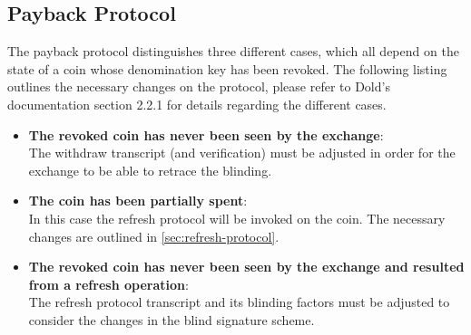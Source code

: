 \subsection{Payback Protocol}
The payback protocol distinguishes three different cases, which all depend on the state of a coin whose denomination key has been revoked.
The following listing outlines the necessary changes on the protocol, please refer to Dold's documentation section 2.2.1 \cite{dold:the-gnu-taler-system} for details regarding the different cases.
\begin{itemize}
  \item \textbf{The revoked coin has never been seen by the exchange}:
        \\The withdraw transcript (and verification) must be adjusted in order for the exchange to be able to retrace the blinding.
  \item \textbf{The coin has been partially spent}:
        \\In this case the refresh protocol will be invoked on the coin.
        The necessary changes are outlined in \ref{sec:refresh-protocol}.
  \item \textbf{The revoked coin has never been seen by the exchange and resulted from a refresh operation}:
        \\The refresh protocol transcript and its blinding factors must be adjusted to consider the changes in the blind signature scheme.
\end{itemize}
